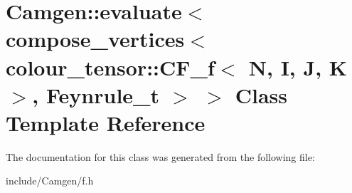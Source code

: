 \hypertarget{a00159}{}\section{Camgen\+:\+:evaluate$<$ compose\+\_\+vertices$<$ colour\+\_\+tensor\+:\+:C\+F\+\_\+f$<$ N, I, J, K $>$, Feynrule\+\_\+t $>$ $>$ Class Template Reference}
\label{a00159}


The documentation for this class was generated from the following file\+:\begin{DoxyCompactItemize}
\item 
include/\+Camgen/f.\+h\end{DoxyCompactItemize}
